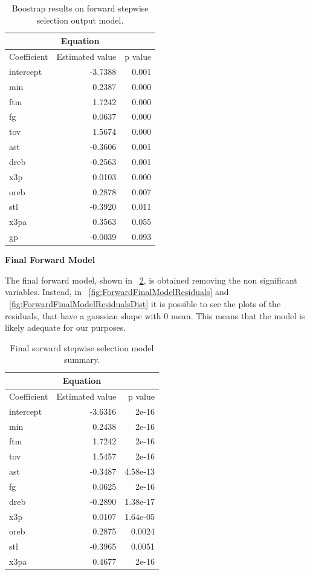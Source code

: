 \begin{table}[H]
	\centering
	\begin{tabular}{|| l | r | r ||} 
		\hline
		\multicolumn{3}{|c|}{Equation} \\
		\hline
		Coefficient & Estimated value & p value \\
		\hline
		intercept & -3.7388 & 0.001 \\
		min & 0.2387 & 0.000 \\
		ftm & 1.7242 & 0.000 \\
		fg & 0.0637 & 0.000 \\
		tov & 1.5674 & 0.000 \\
		ast & -0.3606 & 0.001 \\
		dreb & -0.2563 & 0.001 \\
		x3p & 0.0103 & 0.000 \\
		oreb & 0.2878 & 0.007 \\
		stl & -0.3920 & 0.011 \\
		x3pa & 0.3563 & 0.055 \\
		gp & -0.0039 & 0.093 \\
		\hline
	\end{tabular}
	\caption{Boostrap results on forward stepwise selection output model.}
	\label{table:BootForwardModel}
\end{table}

\vspace{0.2cm}
\noindent
\textbf{Final Forward Model}

The final forward model, shown in \Fig~\ref{table:ForwardFinalModelSummary}, is obtained removing the non significant variables. Instead, in \Fig~\ref{fig:ForwardFinalModelResiduals} and \Fig~\ref{fig:ForwardFinalModelResidualsDist} it is possible to see the plots of the residuals, that have a gaussian shape with 0 mean. This means that the model is likely adequate for our purposes.

\begin{table}[H]
	\centering
	\begin{tabular}{|| l | r | r ||} 
		\hline
		\multicolumn{3}{|c|}{Equation} \\
		\hline
		Coefficient & Estimated value & p value \\
		\hline
		intercept & -3.6316 & 2e-16 \\
		min & 0.2438 & 2e-16 \\
		ftm & 1.7242 & 2e-16 \\
		tov & 1.5457 & 2e-16 \\
		ast & -0.3487 & 4.58e-13 \\
		fg & 0.0625 & 2e-16 \\
		dreb & -0.2890 & 1.38e-17 \\
		x3p & 0.0107 & 1.64e-05 \\
		oreb & 0.2875 & 0.0024 \\
		stl & -0.3965 & 0.0051 \\
		x3pa & 0.4677 & 2e-16 \\
		\hline
	\end{tabular}
	\caption{Final sorward stepwise selection model summary.}
	\label{table:ForwardFinalModelSummary}
\end{table}

